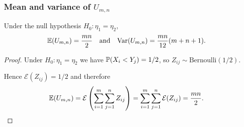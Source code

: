 \subsubsection{Mean and variance of $U_{m,n}$}

\begin{theorem}
Under the null hypothesis $H_0:\eta_1=\eta_2$, 
\[
\mathbb{E}(U_{m,n}) = \frac{mn}{2}
\text{\quad and\quad}
\text{Var}(U_{m,n}) = \frac{mn}{12}(m+n+1).
\]
\end{theorem}

\begin{proof}
Under $H_0:\eta_1=\eta_2$ we have $\mathbb{P}(X_i<Y_j) = 1/2$, so $Z_{ij}\sim\text{Bernoulli}(1/2)$. 

Hence $\mathcal{E}(Z_{ij})=1/2$ and therefore
\[
\mathbb{E}(U_{m,n}) 
	= \mathcal{E}\left(\sum_{i=1}^m\sum_{j=1}^n Z_{ij}\right)
	= \sum_{i=1}^m\sum_{j=1}^n \mathcal{E}(Z_{ij})
	= \frac{mn}{2}.
\]


\end{proof}
